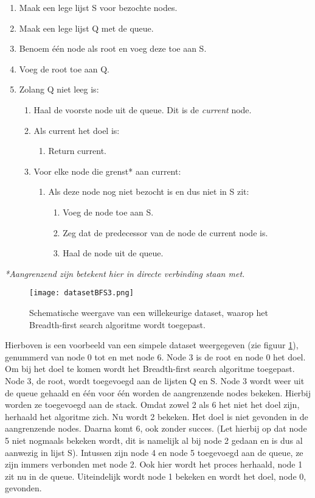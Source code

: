 \begin{enumerate}
\item Maak een lege lijst S voor bezochte nodes.
\item Maak een lege lijst Q met de queue.
\item Benoem \'e\'en node als root en voeg deze toe aan S.
\item Voeg de root toe aan Q. 
\item Zolang Q niet leeg is:
	\begin{enumerate}
	\item Haal de voorste node uit de queue. Dit is de \textit{current} node.
	\item Als current het doel is:
		\begin{enumerate}
		\item Return current.
		\end{enumerate}
	\item Voor elke node die grenst* aan current:
		\begin{enumerate}
		\item Als deze node nog niet bezocht is en dus niet in S zit:
			\begin{enumerate}
			\item Voeg de node toe aan S.
			\item Zeg dat de predecessor van de node de current node is.
			\item Haal de node uit de queue.
			\end{enumerate}
		\end{enumerate}
	\end{enumerate}
\end{enumerate}

\textit{*Aangrenzend zijn betekent hier \textit{in directe verbinding staan met}.}

\begin{figure}[h]
  \centering
    \texttt{[image: datasetBFS3.png]}
  \caption{Schematische weergave van een willekeurige dataset, waarop het Breadth-first search algoritme wordt toegepast.}
  \label{fig:datasetBFS3}
\end{figure}
Hierboven is een voorbeeld van een simpele dataset weergegeven (zie figuur \ref{fig:datasetBFS3}), genummerd van node 0 tot en met node 6. Node 3 is de root en node 0 het doel. Om bij het doel te komen wordt het Breadth-first search algoritme toegepast. Node 3, de root, wordt toegevoegd aan de lijsten Q en S. Node 3 wordt weer uit de queue gehaald en \'e\'en voor \'e\'en worden de aangrenzende nodes bekeken. Hierbij worden ze toegevoegd aan de stack. Omdat zowel 2 als 6 het niet het doel zijn, herhaald het algoritme zich. Nu wordt 2 bekeken. Het doel is niet gevonden in de aangrenzende nodes. Daarna komt 6, ook zonder succes. (Let hierbij op dat node 5 niet nogmaals bekeken wordt, dit is namelijk al bij node 2 gedaan en is dus al aanwezig in lijst S). Intussen zijn node 4 en node 5 toegevoegd aan de queue, ze zijn immers verbonden met node 2. Ook hier wordt het proces herhaald, node 1 zit nu in de queue. Uiteindelijk wordt node 1 bekeken en wordt het doel, node 0, gevonden.

